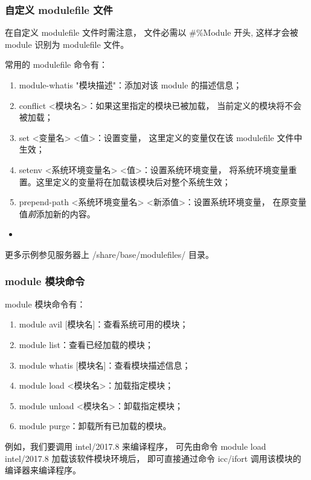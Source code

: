 \documentclass[UTF8]{ctexart}
\newcommand{\mynote}[1]{\colorbox{gray!35}{#1}}
\newcommand{\mynnote}[1]{\colorbox{gray!15}{\color{red}#1}}
\newcommand{\insertbash}[2]{\begin{itemize}\item[]\end{itemize}}
\begin{document}
\subsubsection{自定义 modulefile 文件}
在自定义 modulefile  文件时需注意，
文件必需以 \mynote{\#\%Module} 开头,
这样才会被 module 识别为 modulefile 文件。

常用的 modulefile 命令有：
\begin{enumerate}[\hspace{15mm}（1）]
  \item \mynote{module-whatis "模块描述"}：添加对该 module 的描述信息；
  \item \mynote{conflict <模块名>}：如果这里指定的模块已被加载，
    当前定义的模块将不会被加载；
  \item \mynote{set <变量名> <值>}：设置变量，
    这里定义的变量仅在该 modulefile 文件中生效；
  \item \mynote{setenv <系统环境变量名> <值>}：设置系统环境变量，
    将系统环境变量重置。这里定义的变量将在加载该模块后对整个系统生效；
  \item \mynote{prepend-path <系统环境变量名> <新添值>}：设置系统环境变量，
    在原变量值{\em 前}添加新的内容。
\end{enumerate}

\insertbash{material/module.sh}{modulefile 文件书写示例}

更多示例参见服务器上 /share/base/modulefiles/ 目录。

\subsubsection{module 模块命令}
module 模块命令有：
\begin{enumerate}[\hspace{15mm}（1）]
  \item \mynnote{module avil [模块名]}：查看系统可用的模块；
  \item \mynnote{module list}：查看已经加载的模块；
  \item \mynnote{module whatis [模块名]}：查看模块描述信息；
  \item \mynnote{module load <模块名>}：加载指定模块；
  \item \mynnote{module unload <模块名>}：卸载指定模块；
  \item \mynnote{module purge}：卸载所有已加载的模块。
\end{enumerate}

例如，我们要调用 intel/2017.8 来编译程序，
可先由命令 \mynote{module load intel/2017.8} 加载该软件模块环境后，
即可直接通过命令 icc/ifort 调用该模块的编译器来编译程序。
\end{document}
